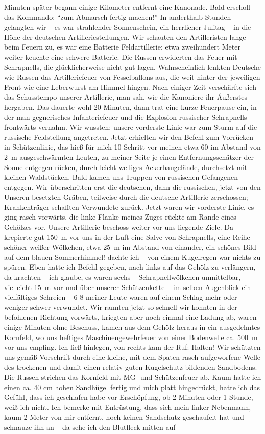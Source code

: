 Minuten später begann einige Kilometer entfernt eine Kanonade. Bald erscholl das Kommando: \enquote{zum Abmarsch fertig machen!} In anderthalb Stunden gelangten wir -- es war strahlender Sonnenschein, ein herrlicher Julitag -- in die Höhe der deutschen Artilleriestellungen. Wir schauten den Artilleristen lange beim Feuern zu, es war eine Batterie Feldartillerie; etwa zweihundert Meter weiter keuchte eine schwere Batterie. Die Russen erwiderten das Feuer mit Schrapnells, die glücklicherweise nicht gut lagen. Wahrscheinlich lenkten Deutsche wie Russen das Artilleriefeuer von Fesselballons aus, die weit hinter der jeweiligen Front wie eine Leberwurst am Himmel hingen. Nach einiger Zeit verschärfte sich das Schusstempo unserer Artillerie, man sah, wie die Kanoniere ihr Äußerstes hergaben. Das dauerte wohl 20 Minuten, dann trat eine kurze Feuerpause ein, in der man gegnerisches Infanteriefeuer und die Explosion russischer Schrapnells frontwärts vernahm. Wir wussten: unsere vorderste Linie war zum Sturm auf die russische Feldstellung angetreten. Jetzt erhielten wir den Befehl zum Vorrücken in Schützenlinie, das hieß für mich 10 Schritt vor meinen etwa 60 im Abstand von 2~m ausgeschwärmten Leuten, zu meiner Seite je einen Entfernungsschätzer der Sonne entgegen rücken, durch leicht welliges Ackerbaugelände, durchsetzt mit kleinen Waldstücken. Bald kamen uns Truppen von russischen Gefangenen entgegen. Wir überschritten erst die deutschen, dann die russischen, jetzt von den Unseren besetzten Gräben, teilweise durch die deutsche Artillerie zerschossen; Krankenträger schafften Verwundete zurück. Jetzt waren wir vorderste Linie, es ging rasch vorwärts, die linke Flanke meines Zuges rückte am Rande eines Gehölzes vor. Unsere Artillerie beschoss weiter vor uns liegende Ziele. Da krepierte gut 150~m vor uns in der Luft eine Salve von Schrapnells, eine Reihe schöner weißer Wölkchen, etwa 25~m im Abstand von einander, ein schönes Bild auf dem blauen Sommerhimmel! dachte ich -- von einem Kugelregen war nichts zu spüren. Eben hatte ich Befehl gegeben, nach links auf das Gehölz zu verlängern, da krachten -- ich glaube, es waren sechs -- Schrapnellwölkchen unmittelbar, vielleicht 15~m vor und über unserer Schützenkette -- im selben Augenblick ein vielfältiges Schreien -- 6-8 meiner Leute waren auf einem Schlag mehr oder weniger schwer verwundet. Wir rannten jetzt so schnell wir konnten in der befohlenen Richtung vorwärts, kriegten aber noch einmal eine Ladung ab, waren einige Minuten ohne Beschuss, kamen aus dem Gehölz heraus in ein ausgedehntes Kornfeld, wo uns heftiges Maschinengewehrfeuer von einer Bodenwelle ca. 500~m vor uns empfing. Ich ließ hinlegen, von rechts kam der Ruf: Halten! Wir schützten uns gemäß Vorschrift durch eine kleine, mit dem Spaten rasch aufgeworfene Welle des trockenen und damit einen relativ guten Kugelschutz bildenden Sandbodens. Die Russen strichen das Kornfeld mit MG- und Schützenfeuer ab. Kaum hatte ich einen ca. 40 cm hohen Sandhügel fertig und mich platt hingedrückt, hatte ich das Gefühl, dass ich geschlafen habe vor Erschöpfung, ob 2 Minuten oder 1 Stunde, weiß ich nicht. Ich bemerke mit Entrüstung, dass sich mein linker Nebenmann, kaum 2 Meter von mir entfernt, noch keinen Sandschutz geschaufelt hat und schnauze ihn an -- da sehe ich den Blutfleck mitten auf 